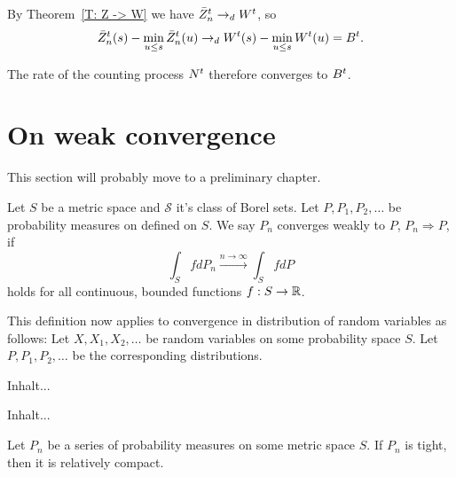 By Theorem~\ref{T: Z -> W} we have $\bar{Z}^t_n \rightarrow_d W^t$,
so
\begin{equation}
\bar{Z}^t_n(s) - \min_{u \leq s}\bar{Z}^t_n(u) \rightarrow_d W^t(s) - \min_{u \leq s}W^t(u) = B^t.
\end{equation}

The rate of the counting process $N^t$ therefore converges to $B^t$.


\section{On weak convergence}

This section will probably move to a preliminary chapter.
\begin{definition}
	Let $S$ be a metric space and $\mathcal{S}$ it's class of Borel sets.
	Let $P, P_1, P_2, \dots$ be probability measures on defined on $S$.
	We say $P_n$ converges weakly to $P$, $P_n \Rightarrow P$, if
	\begin{equation} 
	\int_S fdP_n \xrightarrow{n \rightarrow \infty} \int_S fdP
	\end{equation}
	holds for all continuous, bounded functions $f: S \rightarrow \mathbb{R}$.
\end{definition}

This definition now applies to convergence in distribution of random variables as follows:
Let $X, X_1, X_2, \dots$ be random variables on some probability space $S$.
Let $P, P_1, P_2, \dots$ be the corresponding distributions. 

\begin{definition}[Tightness] \label{D: Tightness}
	Inhalt...
\end{definition}

\begin{definition} \label{D: Rel Compactness}
	Inhalt...
\end{definition}

\begin{theorem} \label{T: Prohorov}
	Let $P_n$ be a series of probability measures on some metric space $S$. If $P_n$ is tight, then it is relatively compact.
\end{theorem}



